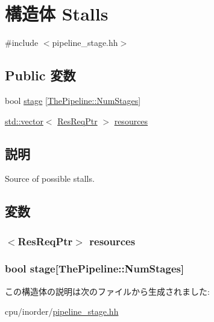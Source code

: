 \hypertarget{structPipelineStage_1_1Stalls}{
\section{構造体 Stalls}
\label{structPipelineStage_1_1Stalls}
}


{\ttfamily \#include $<$pipeline\_\-stage.hh$>$}\subsection*{Public 変数}
\begin{DoxyCompactItemize}
\item 
bool \hyperlink{structPipelineStage_1_1Stalls_a7f7ee2cedce805d9faf18a261242fac3}{stage} \mbox{[}\hyperlink{namespaceThePipeline_a6918d1731267e5f56969bfb5c240be85}{ThePipeline::NumStages}\mbox{]}
\item 
\hyperlink{classstd_1_1vector}{std::vector}$<$ \hyperlink{classResourceRequest}{ResReqPtr} $>$ \hyperlink{structPipelineStage_1_1Stalls_af9fda64ae38e61e396127c777a08e977}{resources}
\end{DoxyCompactItemize}


\subsection{説明}
Source of possible stalls. 

\subsection{変数}
\hypertarget{structPipelineStage_1_1Stalls_af9fda64ae38e61e396127c777a08e977}{
\subsubsection[{resources}]{$<${\bf ResReqPtr}$>$ {\bf resources}}}
\label{structPipelineStage_1_1Stalls_af9fda64ae38e61e396127c777a08e977}
\hypertarget{structPipelineStage_1_1Stalls_a7f7ee2cedce805d9faf18a261242fac3}{
\subsubsection[{stage}]{\setlength{\rightskip}{0pt plus 5cm}bool {\bf stage}\mbox{[}{\bf ThePipeline::NumStages}\mbox{]}}}
\label{structPipelineStage_1_1Stalls_a7f7ee2cedce805d9faf18a261242fac3}


この構造体の説明は次のファイルから生成されました:\begin{DoxyCompactItemize}
\item 
cpu/inorder/\hyperlink{pipeline__stage_8hh}{pipeline\_\-stage.hh}\end{DoxyCompactItemize}
